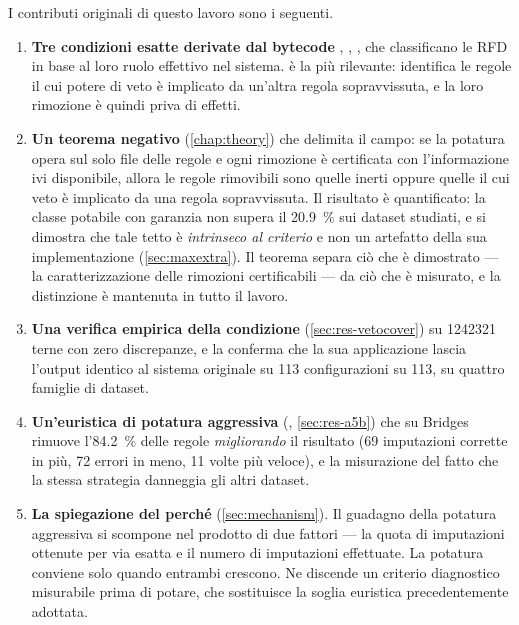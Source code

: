 
I contributi originali di questo lavoro sono i seguenti.

\begin{enumerate}[leftmargin=1.6em]
    \item \textbf{Tre condizioni esatte derivate dal bytecode} \Vone{}, \Vtwo{}, \Vthree{},
    che classificano le RFD in base al loro ruolo effettivo nel sistema. \Vtwo{} è la più
    rilevante: identifica le regole il cui potere di veto è implicato da un'altra regola
    sopravvissuta, e la loro rimozione è quindi priva di effetti.

    \item \textbf{Un teorema negativo} (\autoref{chap:theory}) che delimita il campo: se la
    potatura opera sul solo file delle regole e ogni rimozione è certificata con l'informazione
    ivi disponibile, allora le regole rimovibili sono quelle inerti oppure quelle il cui veto è
    implicato da una regola sopravvissuta. Il risultato è quantificato: la classe potabile con
    garanzia non supera il \SI{20.9}{\percent} sui dataset studiati, e si dimostra che tale tetto
    è \emph{intrinseco al criterio} e non un artefatto della sua implementazione
    (\autoref{sec:maxextra}). Il teorema separa ciò che è dimostrato --- la caratterizzazione
    delle rimozioni certificabili --- da ciò che è misurato, e la distinzione è mantenuta in
    tutto il lavoro.

    \item \textbf{Una verifica empirica della condizione \Vtwo{}} (\autoref{sec:res-vetocover})
    su \num{1242321} terne con zero
    discrepanze, e la conferma che la sua applicazione lascia l'output identico al sistema
    originale su \num{113} configurazioni su \num{113}, su quattro famiglie di dataset.

    \item \textbf{Un'euristica di potatura aggressiva} (, \autoref{sec:res-a5b}) che su Bridges rimuove
    l'\SI{84.2}{\percent} delle regole \emph{migliorando} il risultato (\num{69} imputazioni
    corrette in più, \num{72} errori in meno, \num{11} volte più veloce), e la misurazione del
    fatto che la stessa strategia danneggia gli altri dataset.

    \item \textbf{La spiegazione del perché} (\autoref{sec:mechanism}). Il guadagno della potatura aggressiva si scompone
    nel prodotto di due fattori --- la quota di imputazioni ottenute per via esatta e il numero
    di imputazioni effettuate. La potatura conviene solo quando entrambi crescono. Ne discende
    un criterio diagnostico misurabile prima di potare, che sostituisce la soglia euristica
    precedentemente adottata.


\end{enumerate}

